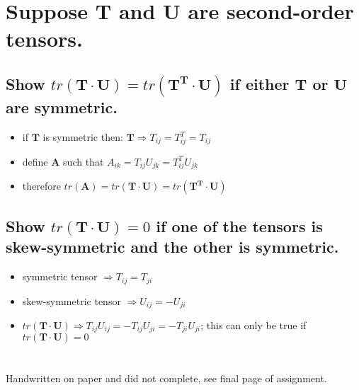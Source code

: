 \documentclass[10pt, letterpaper]{article}
\begin{document}
\section{Suppose \textbf{T} and \textbf{U} are second-order tensors.}
	\subsection{Show $tr(\bm{T} \cdot \bm{U}) = tr(\bm{T^T} \cdot \bm{U})$ if either $\bm{T}$ or $\bm{U}$ are symmetric.}
		\begin{itemize}
			\item if $\bm{T}$ is symmetric then: $\bm{T} \Rightarrow T_{ij} = T_{ij}^T = T_{ij}$
			\item define $\bm{A}$ such that $A_{ik} = T_{ij} U_{jk} = T_{ij}^T U_{jk}$
			\item therefore $tr(\bm{A}) = tr(\bm{T} \cdot \bm{U}) = tr(\bm{T^T} \cdot \bm{U})$
		\end{itemize}
	\subsection{Show $tr(\bm{T} \cdot \bm{U}) = 0$ if one of the tensors is skew-symmetric and the other is symmetric.}
		\begin{itemize}
			\item symmetric tensor $\Rightarrow T_{ij} = T_{ji}$
			\item skew-symmetric tensor $\Rightarrow U_{ij} = -U_{ji}$
			\item $tr(\bm{T} \cdot \bm{U}) \Rightarrow T_{ij} U_{ij}  =- T_{ij} U_{ji} = -T_{ji} U_{ji}$; this can only be true if
				$tr(\bm{T} \cdot \bm{U}) = 0$
		\end{itemize}
\section{}
	Handwritten on paper and did not complete, see final page of assignment.
\end{document}
